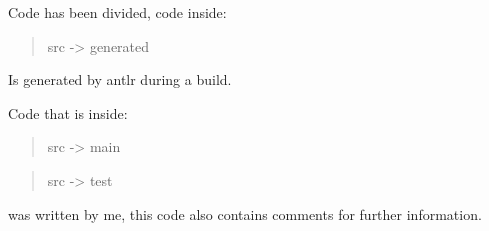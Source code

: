 \documentclass[a4paper,12pt]{article}
\begin{document}
Code has been divided, code inside:
\begin{quotation}
src -> generated
\end{quotation}
Is generated by antlr during a build.


Code that is inside:
\begin{quotation}
src -> main
\end{quotation}
\begin{quotation}
src -> test
\end{quotation}
was written by me, this code also contains comments for further information.
\end{document}
